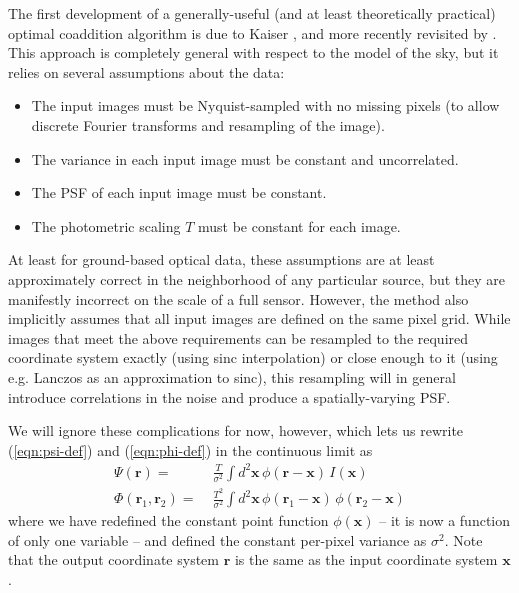 \documentclass[10pt]{article}
\newcommand{\eqnref}[1]{(\ref{eqn:#1})}
\begin{document}
The first development of a generally-useful (and at least theoretically practical) optimal coaddition algorithm is due to Kaiser \citep{Kaiser2001}, and more recently revisited by \cite{2015arXiv151206879Z}.  This approach is completely general with respect to the model of the sky, but it relies on several assumptions about the data:
\begin{itemize}
\item The input images must be Nyquist-sampled with no missing pixels (to allow discrete Fourier transforms and resampling of the image).
\item The variance in each input image must be constant and uncorrelated.
\item The PSF of each input image must be constant.
\item The photometric scaling $T$ must be constant for each image.
\end{itemize}
At least for ground-based optical data, these assumptions are at least approximately correct in the neighborhood of any particular source, but they are manifestly incorrect on the scale of a full sensor.  However, the method also implicitly assumes that all input images are defined on the same pixel grid.  While images that meet the above requirements can be resampled to the required coordinate system exactly (using sinc interpolation) or close enough to it (using e.g. Lanczos as an approximation to sinc), this resampling will in general introduce correlations in the noise and produce a spatially-varying PSF.

We will ignore these complications for now, however, which lets us rewrite \eqnref{psi-def} and \eqnref{phi-def} in the continuous limit as
\begin{align}
\Psi(\bm{r}) =\;& \frac{T}{\sigma^2} \int\!d^2\bm{x}\,
    \phi(\bm{r}-\bm{x}) \, I(\bm{x})
    \\
\Phi(\bm{r}_1,\bm{r}_2) =\;&
    \frac{T^2}{\sigma^2} \int\!d^2\bm{x}\,
    \phi(\bm{r}_1-\bm{x}) \, \phi(\bm{r}_2-\bm{x})
\end{align}
where we have redefined the constant point function $\phi(\bm{x})$ -- it is now a function of only one variable -- and defined the constant per-pixel variance as $\sigma^2$.  Note that the output coordinate system $\bm{r}$ is the same as the input coordinate system $\bm{x}$.
\end{document}
